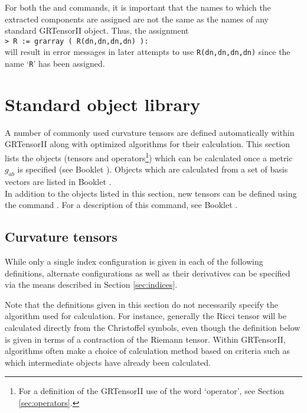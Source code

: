 \documentclass{article}
\begin{document}
{{{For both the  and  commands, it is important
that the names to which the extracted components are assigned are not the same
as the names of any standard GRTensorII object. Thus, the assignment\\

\noindent\texttt{> R := grarray ( R(dn,dn,dn,dn) ):}\\

\noindent will result in error messages in later attempts to use
\texttt{R(dn,dn,dn,dn)} since the name `\texttt{R}' has been assigned.
%
\section{Standard object library} \label{sec:stdobj}
%
A number of commonly used curvature tensors are defined automatically within
GRTensorII along with optimized algorithms for their calculation. This section
lists the objects (tensors and
operators\footnote{For a definition of the GRTensorII use of the word
`operator', see Section \ref{sec:operators}.}) which can be calculated once a
metric $g_{ab}$ is specified (see Booklet \grMakegRef). Objects which are
calculated from a set of basis vectors are listed in Booklet \grBasisRef.\\

In addition to the objects listed in this section, new tensors can be
defined using the command . For a description of this command,
see Booklet \grDefRef.
%
\subsection{Curvature tensors}
%
While only a single index configuration is given in each of the following
definitions, alternate configurations as well as their derivatives can
be specified via the means described in Section \ref{sec:indices}.

Note that the definitions given in this section do not necessarily
specify the algorithm used for calculation. For instance, generally
the Ricci tensor will be calculated directly from the Christoffel
symbols, even though the definition below is given in terms of a
contraction of the Riemann tensor.  Within GRTensorII, algorithms
often make a choice of calculation method based on criteria such
as which intermediate objects have already been calculated.\\

}}}
\end{document}
